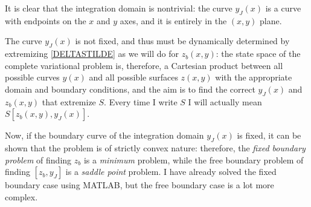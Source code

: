 \documentclass[binding=0.6cm, a4paper]{unifith/unifith}
\theoremstyle{plain}
\theoremstyle{definition}
\begin{document}
It is clear that the integration domain is nontrivial: the curve $y_J(x)$ is a curve with endpoints on the $x$ and $y$ axes, and it is entirely in the $(x,y)$ plane.

The curve $y_J(x)$ is not fixed, and thus must be dynamically determined by extremizing \eqref{DELTASTILDE} as we will do for $z_b(x,y)$: the state space of the complete variational problem is, therefore, a Cartesian product between all possible curves $y(x)$ and all possible surfaces $z(x,y)$ with the appropriate domain and boundary conditions, and the aim is to find the correct $y_J(x)$ and $z_b(x,y)$ that extremize $S$. Every time I write $S$ I will actually mean $S[z_b(x,y),y_J(x)]$. 

Now, if the boundary curve of the integration domain $y_J(x)$ is fixed, it can be shown that the problem is of strictly convex nature: therefore, the \textit{fixed boundary problem} of finding $z_b$ is a \textit{minimum} problem, while the free boundary problem of finding $[z_b,y_J]$ is a \textit{saddle point} problem. I have already solved the fixed boundary case using MATLAB, but the free boundary case is a lot more complex.
\end{document}

